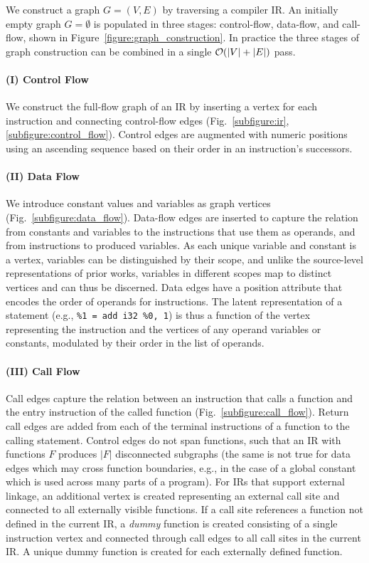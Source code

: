 We construct a \programl graph $G = (V, E)$ by traversing a compiler IR. An
initially empty graph $G = \emptyset$ is populated in three stages:
control-flow, data-flow, and call-flow, shown in
Figure~\ref{figure:graph_construction}. In practice the three stages of graph
construction can be combined in a single $\mathcal{O}{(|V|+|E|)}$ pass.

\paragraph{(I) Control Flow} We construct the full-flow graph of an IR by
inserting a vertex for each instruction and connecting control-flow edges
(Fig.~\ref{subfigure:ir}, \ref{subfigure:control_flow}). Control edges are
augmented with numeric positions using an ascending sequence based on their
order in an instruction's successors.

\paragraph{(II) Data Flow} We introduce constant values and variables as graph
vertices (Fig.~\ref{subfigure:data_flow}). Data-flow edges are inserted to
capture the relation from constants and variables to the instructions that use
them as operands, and from instructions to produced variables. As each unique
variable and constant is a vertex, variables can be distinguished by their
scope, and unlike the source-level representations of prior works, variables in
different scopes map to distinct vertices and can thus be discerned. Data edges
have a position attribute that encodes the order of operands for instructions.
The latent representation of a statement (e.g., \texttt{\%1 = add i32 \%0, 1})
is thus a function of the vertex representing the instruction and the vertices
of any operand variables or constants, modulated by their order in the list of
operands.

\paragraph{(III) Call Flow} Call edges capture the relation between an
instruction that calls a function and the entry instruction of the called
function (Fig.~\ref{subfigure:call_flow}). Return call edges are added from each
of the terminal instructions of a function to the calling statement. Control
edges do not span functions, such that an IR with functions $F$ produces $|F|$
disconnected subgraphs (the same is not true for data edges which may cross
function boundaries, e.g., in the case of a global constant which is used across
many parts of a program). For IRs that support external linkage, an additional
vertex is created representing an external call site and connected to all
externally visible functions. If a call site references a function not defined
in the current IR, a \emph{dummy} function is created  consisting of a single
instruction vertex and connected through call edges to all call sites in the
current IR. A unique dummy function is created for each externally defined
function.
